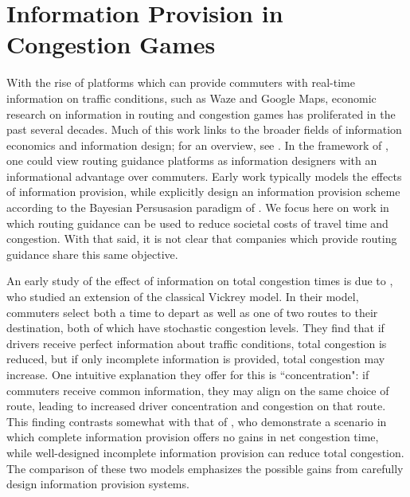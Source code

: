 \documentclass[JEL]{AEA}
\begin{document}
\section{Information Provision in Congestion Games}
\label{information-provision}

With the rise of platforms which can provide commuters with real-time information on traffic conditions, such as Waze and Google Maps, economic research on information in routing and congestion games has proliferated in the past several decades. Much of this work links to the broader fields of information economics and information design; for an overview, see \cite{bergemann-2019}. In the framework of \cite{bergemann-2019}, one could view routing guidance platforms as information designers with an informational advantage over commuters. Early work typically models the effects of information provision, while \cite{das-2017} explicitly design an information provision scheme according to the Bayesian Persusasion paradigm of \cite{kamenica-2011}. We focus here on work in which routing guidance can be used to reduce societal costs of travel time and congestion. With that said, it is not clear that companies which provide routing guidance share this same objective.

An early study of the effect of information on total congestion times is due to \cite{arnott-1991}, who studied an extension of the classical Vickrey model. In their model, commuters select both a time to depart as well as one of two routes to their destination, both of which have stochastic congestion levels. They find that if drivers receive perfect information about traffic conditions, total congestion is reduced, but if only incomplete information is provided, total congestion may increase. One intuitive explanation they offer for this is ``concentration": if commuters receive common information, they may align on the same choice of route, leading to increased driver concentration and congestion on that route. This finding contrasts somewhat with that of \cite{das-2017}, who demonstrate a scenario in which complete information provision offers no gains in net congestion time, while well-designed incomplete information provision can reduce total congestion. The comparison of these two models emphasizes the possible gains from carefully design information provision systems.
\end{document}
